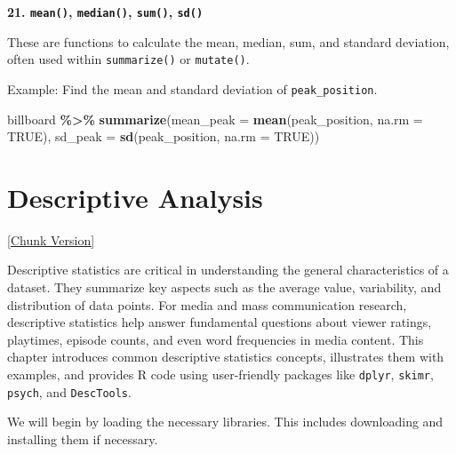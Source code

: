 \documentclass[
]{book}
\newenvironment{Shaded}{\begin{snugshade}}{\end{snugshade}}
\newcommand{\AttributeTok}[1]{\textcolor[rgb]{0.13,0.29,0.53}{#1}}
\newcommand{\ConstantTok}[1]{\textcolor[rgb]{0.56,0.35,0.01}{#1}}
\newcommand{\FunctionTok}[1]{\textcolor[rgb]{0.13,0.29,0.53}{\textbf{#1}}}
\newcommand{\NormalTok}[1]{#1}
\newcommand{\SpecialCharTok}[1]{\textcolor[rgb]{0.81,0.36,0.00}{\textbf{#1}}}
\begin{document}
\textbf{21. \texttt{mean()}, \texttt{median()}, \texttt{sum()}, \texttt{sd()}}

These are functions to calculate the mean, median, sum, and standard deviation, often used within \texttt{summarize()} or \texttt{mutate()}.

Example: Find the mean and standard deviation of \texttt{peak\_position}.

\begin{Shaded}
\begin{Highlighting}[]
\NormalTok{billboard }\SpecialCharTok{\%\textgreater{}\%}
  \FunctionTok{summarize}\NormalTok{(}\AttributeTok{mean\_peak =} \FunctionTok{mean}\NormalTok{(peak\_position, }\AttributeTok{na.rm =} \ConstantTok{TRUE}\NormalTok{), }
            \AttributeTok{sd\_peak =} \FunctionTok{sd}\NormalTok{(peak\_position, }\AttributeTok{na.rm =} \ConstantTok{TRUE}\NormalTok{))}
\end{Highlighting}
\end{Shaded}

\chapter{Descriptive Analysis}\label{descriptive-analysis}

\href{_book/files/09-descriptive_stats-chunks.Rmd}{{[}Chunk Version{]}}

Descriptive statistics are critical in understanding the general characteristics of a dataset. They summarize key aspects such as the average value, variability, and distribution of data points. For media and mass communication research, descriptive statistics help answer fundamental questions about viewer ratings, playtimes, episode counts, and even word frequencies in media content. This chapter introduces common descriptive statistics concepts, illustrates them with examples, and provides R code using user-friendly packages like \texttt{dplyr}, \texttt{skimr}, \texttt{psych}, and \texttt{DescTools}.

We will begin by loading the necessary libraries. This includes downloading and installing them if necessary.
\end{document}

